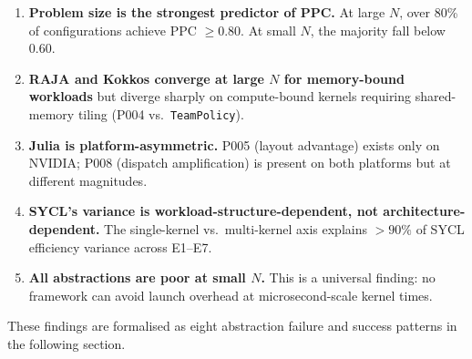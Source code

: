 \begin{enumerate}
    \item \textbf{Problem size is the strongest predictor of PPC.} At large
    $N$, over 80\% of configurations achieve PPC $\geq 0.80$. At small $N$,
    the majority fall below 0.60.

    \item \textbf{RAJA and Kokkos converge at large $N$ for memory-bound
    workloads} but diverge sharply on compute-bound kernels requiring
    shared-memory tiling (P004 vs.\ \texttt{TeamPolicy}).

    \item \textbf{Julia is platform-asymmetric.} P005 (layout advantage)
    exists only on NVIDIA; P008 (dispatch amplification) is present on both
    platforms but at different magnitudes.

    \item \textbf{SYCL's variance is workload-structure-dependent, not
    architecture-dependent.} The single-kernel vs.\ multi-kernel axis
    explains $> 90\%$ of SYCL efficiency variance across E1--E7.

    \item \textbf{All abstractions are poor at small $N$.} This is a
    universal finding: no framework can avoid launch overhead at
    microsecond-scale kernel times.
\end{enumerate}

These findings are formalised as eight abstraction failure and success patterns
in the following section.
